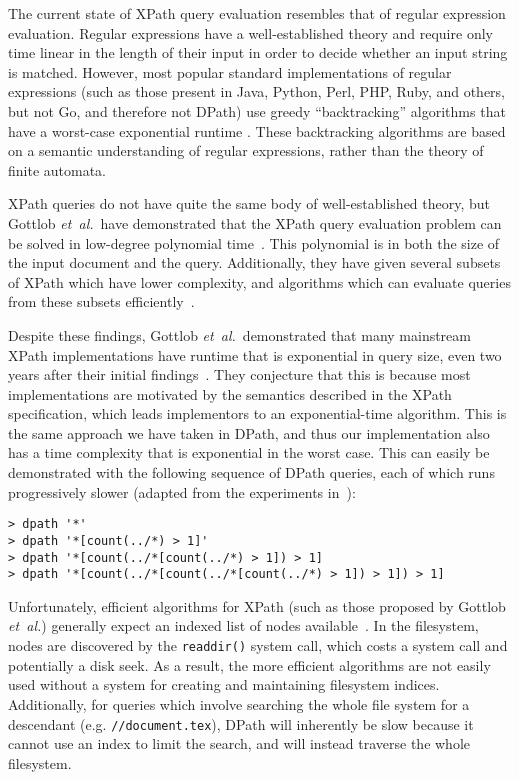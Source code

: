 \documentclass{article}
\begin{document}
The current state of XPath query evaluation resembles that of regular expression
evaluation. Regular expressions have a well-established theory and require only
time linear in the length of their input in order to decide whether an input
string is matched. However, most popular standard implementations of regular
expressions (such as those present in Java, Python, Perl, PHP, Ruby, and others,
but not Go, and therefore not DPath) use greedy ``backtracking'' algorithms that
have a worst-case exponential runtime \cite{rsc}. These backtracking algorithms
are based on a semantic understanding of regular expressions, rather than the
theory of finite automata.

XPath queries do not have quite the same body of well-established theory, but
Gottlob \emph{et~al.}\ have demonstrated that the XPath query evaluation problem
can be solved in low-degree polynomial time~\cite{gottlob2005}. This polynomial
is in both the size of the input document and the query. Additionally, they have
given several subsets of XPath which have lower complexity, and algorithms which
can evaluate queries from these subsets
efficiently~\cite{gottlob2003,gottlob2005}.

Despite these findings, Gottlob \emph{et~al.}\ demonstrated that many mainstream
XPath implementations have runtime that is exponential in query size, even two
years after their initial findings~\cite{gottlob2005}. They conjecture that this
is because most implementations are motivated by the semantics described in the
XPath specification, which leads implementors to an exponential-time algorithm.
This is the same approach we have taken in DPath, and thus our implementation
also has a time complexity that is exponential in the worst case. This can
easily be demonstrated with the following sequence of DPath queries, each of
which runs progressively slower (adapted from the experiments
in~\cite{gottlob2005}):

\begin{lstlisting}
> dpath '*'
> dpath '*[count(../*) > 1]'
> dpath '*[count(../*[count(../*) > 1]) > 1]
> dpath '*[count(../*[count(../*[count(../*) > 1]) > 1]) > 1]
\end{lstlisting}

Unfortunately, efficient algorithms for XPath (such as those proposed by Gottlob
\emph{et~al.}) generally expect an indexed list of nodes
available~\cite{gottlob2005}. In the filesystem, nodes are discovered by the
\texttt{readdir()} system call, which costs a system call and potentially a disk
seek. As a result, the more efficient algorithms are not easily used without a
system for creating and maintaining filesystem indices. Additionally, for
queries which involve searching the whole file system for a descendant (e.g.
\texttt{//document.tex}), DPath will inherently be slow because it cannot use an
index to limit the search, and will instead traverse the whole filesystem.
\end{document}
